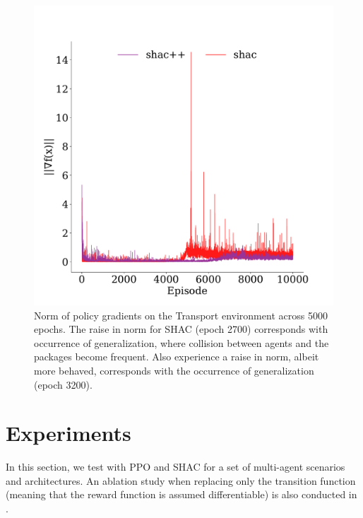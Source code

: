 \begin{figure}
    \includegraphics[width=\columnwidth]{figs/grads-transformer-transport.pdf}
    \caption{Norm of policy gradients on the Transport environment across 5000 epochs. The raise in norm for SHAC (epoch 2700) corresponds with occurrence of generalization, where collision between agents and the packages become frequent. Also \fname{} experience a raise in norm, albeit more behaved, corresponds with the occurrence of generalization (epoch 3200).}\label{fig:grads-transformer-transport}

\end{figure}

\section{Experiments}\label{sect:experiments}

In this section, we test \fname{} with PPO and SHAC for a set of multi-agent scenarios and architectures. An ablation study when replacing only the transition function (meaning that the reward function is assumed differentiable) is also conducted in .

